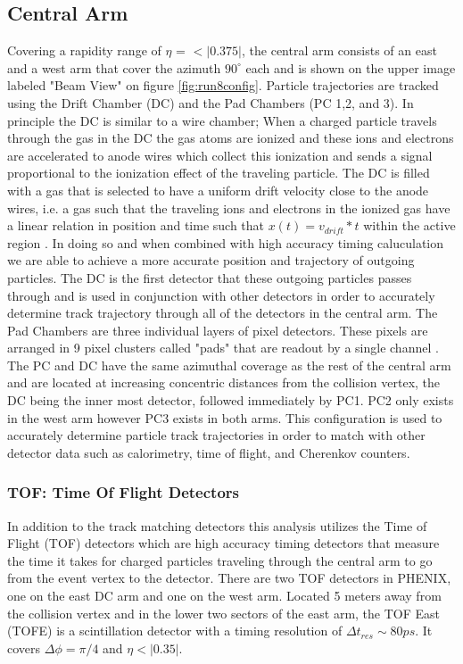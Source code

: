 \subsection{Central Arm}
Covering a rapidity range of $\eta$ = $<|0.375|$, the central arm consists of an east and a west arm that cover the azimuth $90^{\circ}$ each \citep{EMCfocus} and is shown on the upper image labeled "Beam View" on figure \ref{fig:run8config}. Particle trajectories are tracked using the Drift Chamber (DC) and the Pad Chambers (PC 1,2, and 3). In principle the DC is similar to a wire chamber; When a charged particle travels through the gas in the DC the gas atoms are ionized and these ions and electrons are accelerated to anode wires which collect this ionization and sends a signal proportional to the ionization effect of the traveling particle. The DC is filled with a gas that is selected to have a uniform drift velocity close to the anode wires, i.e. a gas such that the traveling ions and electrons in the ionized gas have a linear relation in position and time such that $x(t) = v_{drift} * t$ within the active region \citep{DCfocus}. In doing so and when combined with high accuracy timing caluculation we are able to achieve a more accurate position and trajectory of outgoing particles. The DC is the first detector that these outgoing particles passes through and is used in conjunction with other detectors in order to accurately determine track trajectory through all of the detectors in the central arm.
The Pad Chambers are three individual layers of pixel detectors. These pixels are arranged in 9 pixel clusters called "pads" that are readout by a single channel \citep{PCfocus}. The PC and DC have the same azimuthal coverage as the rest of the central arm and are located at increasing concentric distances from the collision vertex, the DC being the inner most detector, followed immediately by PC1.  PC2 only exists in the west arm however PC3 exists in both arms. This configuration is used to accurately determine particle track trajectories in order to match with other detector data such as calorimetry, time of flight, and Cherenkov counters.

\subsubsection{TOF: Time Of Flight Detectors}

In addition to the track matching detectors this analysis utilizes the Time of Flight (TOF) detectors which are high accuracy timing detectors that measure the time it takes for charged particles traveling through the central arm to go from the event vertex to the detector\citep{TOFfocus}. There are two TOF detectors in PHENIX, one on the east DC arm and one on the west arm. Located 5 meters away from the collision vertex and in the lower two sectors of the east arm, the TOF East (TOFE) is a scintillation detector with a timing resolution of $\Delta t_{res} \sim 80 ps$. It covers $\Delta\phi = \pi / 4$ and $\eta < |0.35|$. 

